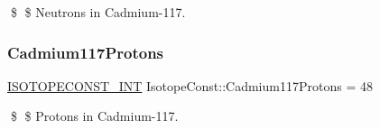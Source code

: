 \$ \$ Neutrons in Cadmium-\/117. \mbox{\label{group___isotope_const-_cadmium-_cd117_ga6b10d7b3fe8580ef7fa868be1e16c29b}} 
\subsubsection{\texorpdfstring{Cadmium117\+Protons}{Cadmium117Protons}}
{\footnotesize\ttfamily \mbox{\hyperlink{group___isotope_const-_macros_ga5f18360b3e99483a35c32d789e62621c}{I\+S\+O\+T\+O\+P\+E\+C\+O\+N\+S\+T\+\_\+\+I\+NT}} Isotope\+Const\+::\+Cadmium117\+Protons = 48}

\$ \$ Protons in Cadmium-\/117. 